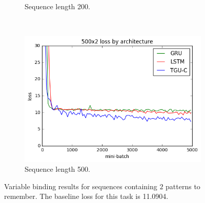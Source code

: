 \begin{figure}[p]
\begin{subfigure}[t]{0.3\linewidth}
	\caption{Sequence length 200.}
\end{subfigure}~
\begin{subfigure}[t]{0.3\linewidth}
	\includegraphics[width=\linewidth]{exps/vbind/plots/500x2}
	\caption{Sequence length 500.}
\end{subfigure}

\caption[Variable binding results, two patterns]
{Variable binding results for sequences containing \(2\) patterns to remember. The baseline loss for this
task is 11.0904.}
\label{fig:vbindn2}
\end{figure}

